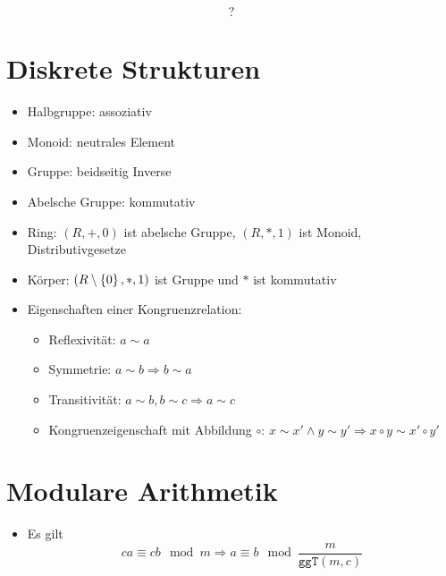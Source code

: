 \documentclass[landscape, 8pt, a4paper]{extarticle}
\newcommand{\ggT}{\texttt{ggT}}
\newcommand{\simpleset}[1]{\ensuremath\left\{ #1 \right\}}
\begin{document}
\begin{multicols}{3}
\begin{itemize}
		\begin{equation*}
			?
		\end{equation*}
	\end{itemize}



	\section{Diskrete Strukturen}
	\begin{itemize}
		\item Halbgruppe: assoziativ
		\item Monoid: neutrales Element
		\item Gruppe: beidseitig Inverse
		\item Abelsche Gruppe: kommutativ
		\item Ring: $(R,+,0)$ ist abelsche Gruppe, $(R,*,1)$ ist Monoid, Distributivgesetze
		\item Körper: $(R\setminus\simpleset 0, *,1)$ ist Gruppe und $*$ ist kommutativ

		
		\item Eigenschaften einer Kongruenzrelation:%
		\begin{itemize}%
			\item Reflexivität: $a\sim a$
			\item Symmetrie: $a\sim b\Rightarrow b\sim a$
			\item Transitivität: $a\sim b, b\sim c\Rightarrow a\sim c$
			\item Kongruenzeigenschaft mit Abbildung $\circ$: $x\sim x'\wedge y\sim y'\Rightarrow x\circ y\sim x'\circ y'$ 
		\end{itemize}

	\end{itemize}


	\section{Modulare Arithmetik}
	\begin{itemize}
		\item Es gilt
		\begin{equation*}
			ca\equiv cb\mod m\Rightarrow a\equiv b\mod \frac{m}{\ggT(m,c)}
		\end{equation*}


\end{itemize}
\end{multicols}
\end{document}
